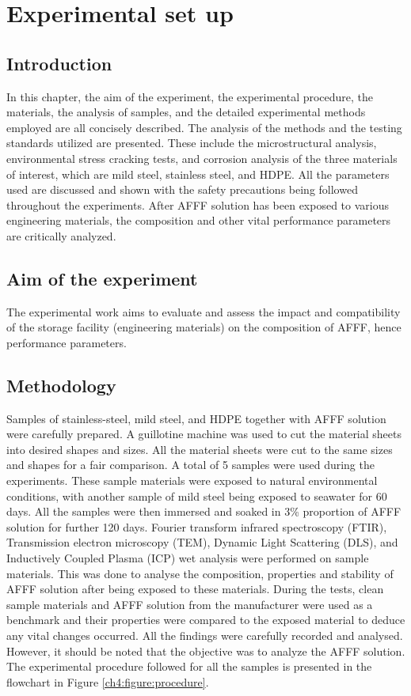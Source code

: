 \documentclass[12pt]{report}
\begin{document}
\chapter{Experimental set up}
\section{Introduction}
In this chapter, the aim of the experiment, the experimental procedure, the materials, the analysis of samples, and the detailed experimental methods employed are all concisely described. The analysis of the methods and the testing standards utilized are presented. These include the microstructural analysis, environmental stress cracking tests, and corrosion analysis of the three materials of interest, which are mild steel, stainless steel, and HDPE. All the parameters used are discussed and shown with the safety precautions being followed throughout the experiments. After AFFF solution has been exposed to various engineering materials, the composition and other vital performance parameters are critically analyzed.

\section{Aim of the experiment}
The experimental work aims to evaluate and assess the impact and compatibility of the storage facility (engineering materials) on the composition of AFFF, hence performance parameters. 

\section{Methodology}
Samples of stainless-steel, mild steel, and HDPE together with AFFF solution were carefully prepared. A guillotine machine was used to cut the material sheets into desired shapes and sizes. All the material sheets were cut to the same sizes and shapes for a fair comparison. A total of 5 samples were used during the experiments. These sample materials were exposed to natural environmental conditions, with another sample of mild steel being exposed to seawater for 60 days. All the samples were then immersed and soaked in 3\% proportion of AFFF solution for further 120 days. Fourier transform infrared spectroscopy (FTIR), Transmission electron microscopy (TEM), Dynamic Light Scattering (DLS), and Inductively Coupled Plasma (ICP) wet analysis were performed on sample materials. This was done to analyse the composition, properties and stability of AFFF solution after being exposed to these materials. 
During the tests, clean sample materials and AFFF solution from the manufacturer were used as a benchmark and their properties were compared to the exposed material to deduce any vital changes occurred. All the findings were carefully recorded and analysed. However, it should be noted that the objective was to analyze the AFFF solution. The experimental procedure followed for all the samples is presented in the flowchart in Figure \ref{ch4:figure:procedure}. 
\end{document}
